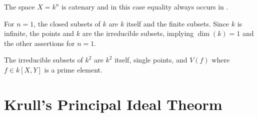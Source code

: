 \documentclass[a4paper,parskip=full,numbers=enddot]{scrreprt}
\begin{document}
\setcounter{thm}{4}
\begin{thm}
 The space $X=k^n$ is catenary and in this case equality always occurs in .
\end{thm}
\begin{example}
 For $n=1$, the closed subsets of $k$ are $k$ itself and the finite subsets. Since $k$ is infinite, the points and $k$ are the irreducible subsets, implying $\dim(k) = 1 $ and the other assertions for $n=1$.
\end{example}
\begin{example}
 The irreducible subsets of $k^2$ are $k^2$ itself, single points, and $V(f)$ where $f\in k[X,Y]$ is a prime element.
\end{example}








\chapter{Krull's Principal Ideal Theorm}
\end{document}
